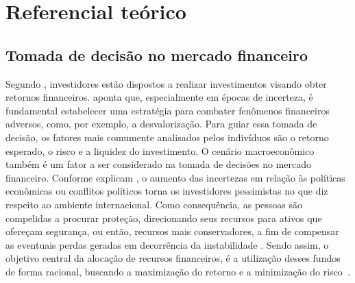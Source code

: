 
\chapter{Referencial teórico}
\label{chap_referencial_teorico}

\section{Tomada de decisão no mercado financeiro}
\label{sec_tomada_de_decisao_no_mercado_financeiro}

Segundo , investidores estão dispostos a realizar investimentos visando obter retornos financeiros.  aponta que, especialmente em épocas de incerteza, é fundamental estabelecer uma estratégia para combater fenômenos financeiros adversos, como, por exemplo, a desvalorização. Para guiar essa tomada de decisão, os fatores mais comumente analisados pelos indivíduos são o retorno esperado, o risco e a liquidez do investimento. O cenário macroeconômico também é um fator a ser considerado na tomada de decisões no mercado financeiro. Conforme explicam , o aumento das incertezas em relação às políticas econômicas ou conflitos políticos torna os investidores pessimistas no que diz respeito ao ambiente internacional. Como consequência, as pessoas são compelidas a procurar proteção, direcionando seus recursos para ativos que ofereçam segurança, ou então, recursos mais conservadores, a fim de compensar as eventuais perdas geradas em decorrência da instabilidade \cite{umar2021bitcoin}. Sendo assim, o objetivo central da alocação de recursos financeiros, é a utilização desses fundos de forma racional, buscando a maximização do retorno e a minimização do risco~\cite{adil2022financial}.

